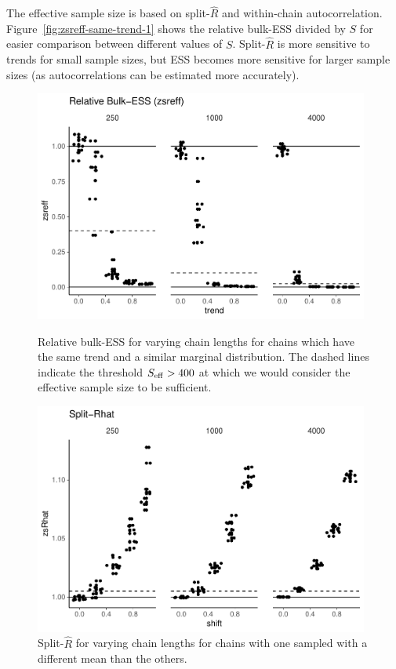 \documentclass[american,]{article}
\theoremstyle{definition}
\begin{document}
The effective sample size is based on split-\(\widehat{R}\) and
within-chain autocorrelation. Figure~\ref{fig:zsreff-same-trend-1}
shows the relative bulk-ESS divided by \(S\) for easier
comparison between different values of \(S\).
%
Split-\(\widehat{R}\) is more sensitive to trends for
small sample sizes, but ESS becomes more sensitive for larger sample
sizes (as autocorrelations can be estimated more accurately).
\begin{figure}[tp]
  \centering
  \begin{minipage}{0.48\textwidth}
  \includegraphics[width=0.98\textwidth]{graphics/zsreff-same-trend-1.pdf}
  \caption{Relative bulk-ESS for varying chain lengths for chains which have
    the same trend and a similar marginal distribution. The dashed
    lines indicate the threshold \(S_{\rm eff} > 400\) at which we
    would consider the effective sample size to be sufficient.}
  \label{fig:zsreff-same-trend-1}
\end{minipage}
\hfill
  \begin{minipage}{0.48\textwidth}
  \includegraphics[width=0.98\textwidth]{graphics/zsrhat-shifted-chain-1.pdf}
  \caption{Split-\(\widehat{R}\) for varying chain lengths
    for chains with one sampled with a different mean than the others.\\~\\~}
  \label{fig:zsrhat-shifted-chain-1}
\end{minipage}
\end{figure}
\end{document}
